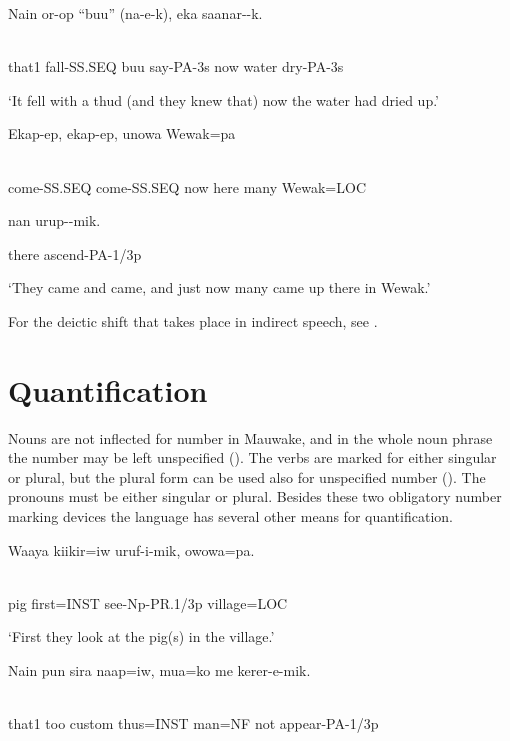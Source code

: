 \ea%
\label{ex:x475}
\gll Nain  or-op  ``buu''  (na-e-k),    eka  saanar--k. \\
      \\
\glt
\z

that1  fall-SS.SEQ  buu  say-PA-3s  now  water  dry-PA-3s

`It fell with a thud (and they knew that) now the water had dried up.'

\ea%
\label{ex:x1891}
\gll Ekap-ep,  ekap-ep,    unowa  Wewak=pa \\
      \\
\glt
\z

come-SS.SEQ  come-SS.SEQ  now  here  many  Wewak=LOC  

nan  urup--mik.

there  ascend-PA-1/3p

`They came and came, and just now many came up there in Wewak.'

For the deictic shift that takes place in indirect speech, see .

\section{Quantification}
\hypertarget{RefHeading22561935131865}{}
Nouns are not inflected for number in Mauwake, and in the whole noun phrase the number may be left unspecified (). The verbs are marked for either singular or plural, but the plural form can be used also for unspecified number (). The pronouns must be either singular or plural. Besides these two obligatory number marking devices the language has several other means for quantification.

\ea%
\label{ex:x1284}
\gll Waaya  kiikir=iw  uruf-i-mik,  owowa=pa. \\
      \\
\glt
\z

pig  first=INST  see-Np-PR.1/3p  village=LOC

`First they look at the pig(s) in the village.'

\ea%
\label{ex:x1285}
\gll Nain  pun  sira  naap=iw,  mua=ko  me  kerer-e-mik. \\
      \\
\glt
\z

that1  too  custom  thus=INST  man=NF  not  appear-PA-1/3p

